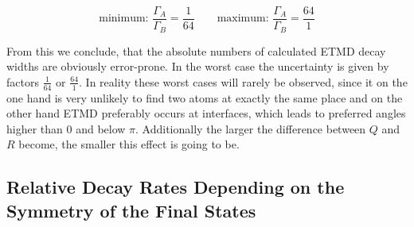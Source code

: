 \begin{figure}[h]
 \centering
 
 \caption{}
 \label{}
\end{figure}

\begin{equation}
\text{minimum: } \frac{\Gamma_{A}}{\Gamma_B}= \frac{1}{64} \quad\quad
\text{maximum: } \frac{\Gamma_{A}}{\Gamma_B}= \frac{64}{1}
\end{equation}

From this we conclude, that the absolute numbers of calculated ETMD
decay widths are obviously error-prone. In the worst case the uncertainty
is given by factors $\frac{1}{64}$ or $\frac{64}{1}$.
In reality these worst cases will rarely be observed, since it on
the one hand is very unlikely to find two atoms at exactly the same place
and on the other hand ETMD preferably occurs at interfaces, which leads
to preferred angles higher than 0 and below $\pi$.
Additionally the larger the difference between $Q$ and $R$ become, the
smaller this effect is going to be.


\subsection{Relative Decay Rates Depending on the Symmetry of the Final States}
